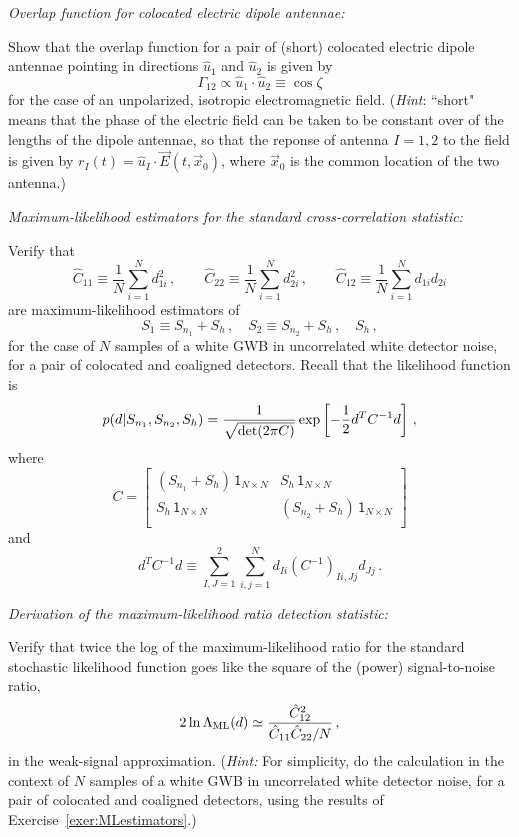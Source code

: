 \documentclass[11pt]{article}
\numberwithin{equation}{section}
\def\be{\begin{equation}}
\def\ee{\end{equation}}
\def\i{\item{}}
\newcommand{\unit}{\mathsf{1}}
\begin{document}
\i {\em Overlap function for colocated electric dipole antennae:}
\label{exer:7}

Show that the overlap function for a pair of (short)
colocated electric dipole antennae pointing in directions 
$\hat u_1$ and $\hat u_2$ is given by 
%
\be
\Gamma_{12} 
\propto
\hat u_1\cdot\hat u_2 
\equiv\cos\zeta
\ee
% 
for the case of an unpolarized, isotropic electromagnetic field.
({\em Hint}: ``short" means that the phase of the electric 
field can be taken to be constant over of the lengths of 
the dipole antennae, 
so that the reponse of antenna $I=1,2$ to the field is
given by $r_I(t)=\hat u_I\cdot\vec E(t, \vec x_0)$, where
$\vec x_0$ is the common location of the two antenna.)
 
\i {\em Maximum-likelihood estimators for the standard 
cross-correlation statistic:}
\label{exer:8}

\label{exer:MLestimators} 
Verify that 
%
\be
\hat C_{11}\equiv \frac{1}{N}\sum_{i=1}^N d_{1i}^2\,,
\qquad
\hat C_{22}\equiv \frac{1}{N}\sum_{i=1}^N d_{2i}^2\,,
\qquad
\hat C_{12}\equiv \frac{1}{N}\sum_{i=1}^N d_{1i} d_{2i}
\ee
%
are maximum-likelihood estimators of 
%
\be
S_1\equiv S_{n_1}+S_h\,,
\quad
S_2\equiv S_{n_2}+S_h\,,
\quad
S_h\,,
\ee
for the case of $N$ samples of a white GWB in uncorrelated
white detector noise, for a pair of colocated and coaligned 
detectors.
Recall that the likelihood function is
%
\be
p(d|S_{n_1}, S_{n_2}, S_h) =\frac{1}{\sqrt{{\rm det}(2\pi C)}}
\exp\left[-\frac{1}{2}d^T C^{-1} d\right]\,,
\ee
%
where
\be
C
= \left[
\begin{array}{cc}
(S_{n_1} +S_h)\,\unit_{N\times N} & S_h\,\unit_{N\times N}
\\
S_h\,\unit_{N\times N} & (S_{n_2} +S_h)\,\unit_{N\times N}
\\
\end{array}
\right]
\label{e:C_marginalized}
\ee
%
and 
%
\be
d^T C^{-1} d
\equiv \sum_{I,J=1}^2\sum_{i,j=1}^N
d_{Ii} \left(C^{-1}\right)_{Ii,Jj} d_{Jj}\,.
\label{e:argexp}
\ee

\i {\em Derivation of the maximum-likelihood ratio detection statistic:}
\label{exer:9}

Verify that twice the log of the maximum-likelihood
ratio for the standard stochastic likelihood function
goes like the square of the (power) signal-to-noise ratio,
\be
2\ln \Lambda_{\rm ML}(d) \simeq
\frac{\hat C_{12}^2}{\hat C_{11}\hat C_{22}/N}\,,
\ee
in the weak-signal approximation.
({\em Hint:} For simplicity, do the calculation in the context 
of $N$ samples of a white GWB in uncorrelated 
white detector noise, for a pair of colocated and coaligned
detectors, using the results of Exercise~\ref{exer:MLestimators}.)
\end{document}
